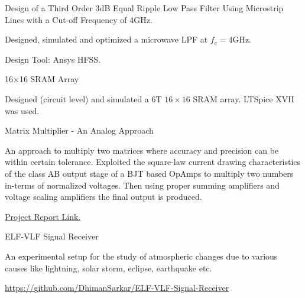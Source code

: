 \begin{cventries}
  \cventry
    {Design of a Third Order 3dB Equal Ripple Low Pass Filter Using Microstrip Lines with a Cut-off Frequency of 4GHz.} %
    {} %
    {} %
    {} %
    {
      \begin{cvitems} %
        \item {Designed, simulated and optimized a microwave LPF at $f_c=4$GHz.}
        \item {Design Tool: Ansys HFSS.}
      \end{cvitems}
    }


  \cventry
    {16$\times$16 SRAM Array} %
    {} %
    {} %
    {} %
    {
      \begin{cvitems} %
        \item {Designed (circuit level) and simulated a 6T $16\times16$ SRAM array. LTSpice XVII was used.}
      \end{cvitems}
    }


  \cventry
    {Matrix Multiplier - An Analog Approach} %
    {} %
    {} %
    {} %
    {
      \begin{cvitems} %
        \item {An approach to multiply two matrices where accuracy and precision can be within certain tolerance. Exploited the square-law current drawing characteristics of the class AB output stage of a BJT based OpAmps to multiply two numbers in-terms of normalized voltages. Then using proper summing amplifiers and voltage scaling amplifiers the final output is produced.}
        \item {\href{https://github.com/DhimanSarkar/BTech-Major-Project/raw/master/BTech Major Project/report.pdf}{Project Report Link.}}
      \end{cvitems}
    }


  \cventry
    {ELF-VLF Signal Receiver} %
    {} %
    {} %
    {} %
    {
      \begin{cvitems} %
        \item {An experimental setup for the study of atmospheric changes due to various causes like lightning, solar storm, eclipse, earthquake etc.}
        \item {\href{https://github.com/DhimanSarkar/ELF-VLF-Signal-Receiver}{https://github.com/DhimanSarkar/ELF-VLF-Signal-Receiver}}
      \end{cvitems}
    }


\end{cventries}
